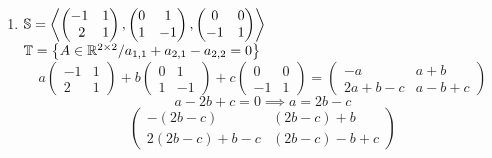 \documentclass[../practica.root.tex]{subfiles}
\begin{document}
\begin{enumerate}
\begin{enumerate}
              \item $\S = \left\langle
                        \begin{pmatrix}
                            -1 & 1 \\ 2 & 1
                        \end{pmatrix},
                        \begin{pmatrix}
                            0 & 1 \\ 1 & -1
                        \end{pmatrix},
                        \begin{pmatrix}
                            0 & 0 \\ -1 & 1
                        \end{pmatrix}
                        \right\rangle$ \\ $\mathbb{T} = \left\{ A \in \mathbb{R}^{2\times2} / a_{1,1} + a_{2,1} - a_{2,2} = 0 \right\}$
                    \[
                        a
                        \begin{pmatrix}
                            -1 & 1 \\ 2 & 1
                        \end{pmatrix}
                        +
                        b
                        \begin{pmatrix}
                            0 & 1 \\ 1 & -1
                        \end{pmatrix}
                        +
                        c
                        \begin{pmatrix}
                            0 & 0 \\ -1 & 1
                        \end{pmatrix}
                        =
                        \begin{pmatrix}
                            -a        & a + b     \\
                            2a + b -c & a - b + c
                        \end{pmatrix}
                    \]
                    \[ a - 2b + c = 0 \implies a = 2b - c \]
                    \[
                        \begin{pmatrix}
                            -(2b - c)        & (2b - c) + b     \\
                            2(2b - c) + b -c & (2b - c) - b + c
                        \end{pmatrix}
\]
\end{enumerate}
\end{enumerate}
\end{document}
